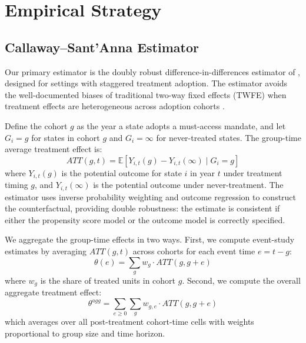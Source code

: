 \documentclass[12pt]{article}
\newcommand{\E}{\mathbb{E}}
\begin{document}
\section{Empirical Strategy}\label{sec:empirical}

\subsection{Callaway--Sant'Anna Estimator}\label{sec:empirical_cs}

Our primary estimator is the doubly robust difference-in-differences estimator of \citet{callaway2021difference}, designed for settings with staggered treatment adoption. The estimator avoids the well-documented biases of traditional two-way fixed effects (TWFE) when treatment effects are heterogeneous across adoption cohorts \citep{goodmanbacon2021difference, borusyak2024revisiting, sunab2021estimating}.

Define the cohort $g$ as the year a state adopts a must-access mandate, and let $G_i = g$ for states in cohort $g$ and $G_i = \infty$ for never-treated states. The group-time average treatment effect is:
\begin{equation}\label{eq:att}
ATT(g, t) = \E\left[Y_{i,t}(g) - Y_{i,t}(\infty) \mid G_i = g\right]
\end{equation}
where $Y_{i,t}(g)$ is the potential outcome for state $i$ in year $t$ under treatment timing $g$, and $Y_{i,t}(\infty)$ is the potential outcome under never-treatment. The estimator uses inverse probability weighting and outcome regression to construct the counterfactual, providing double robustness: the estimate is consistent if either the propensity score model or the outcome model is correctly specified.

We aggregate the group-time effects in two ways. First, we compute event-study estimates by averaging $ATT(g, t)$ across cohorts for each event time $e = t - g$:
\begin{equation}\label{eq:eventstudy}
\theta(e) = \sum_g w_g \cdot ATT(g, g + e)
\end{equation}
where $w_g$ is the share of treated units in cohort $g$. Second, we compute the overall aggregate treatment effect:
\begin{equation}\label{eq:aggregate}
\theta^{agg} = \sum_{e \geq 0} \sum_g w_{g,e} \cdot ATT(g, g + e)
\end{equation}
which averages over all post-treatment cohort-time cells with weights proportional to group size and time horizon.
\end{document}
